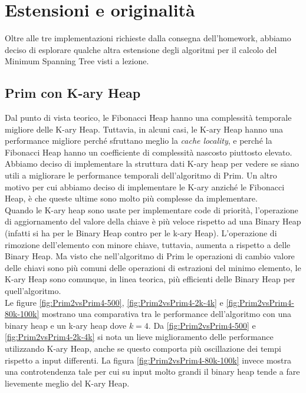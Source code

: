 \section{Estensioni e originalità}
\label{cap:extensions-and-originalities}

Oltre alle tre implementazioni richieste dalla consegna dell'homework, abbiamo deciso di esplorare qualche altra estensione degli algoritmi per il calcolo del Minimum Spanning Tree visti a lezione.

\subsection{Prim con K-ary Heap}

Dal punto di vista teorico, le Fibonacci Heap hanno una complessità temporale migliore delle K-ary Heap.
Tuttavia, in alcuni casi, le K-ary Heap hanno una performance migliore perché sfruttano meglio la \textit{cache locality}, e perché la Fibonacci Heap hanno un coefficiente di complessità nascosto piuttosto elevato. Abbiamo deciso di implementare la struttura dati K-ary heap per vedere se siano utili a migliorare le performance temporali dell'algoritmo di Prim.
Un altro motivo per cui abbiamo deciso di implementare le K-ary anziché le Fibonacci Heap, è che queste ultime sono molto più complesse da implementare. \\

\noindent Quando le K-ary heap sono usate per implementare code di priorità, l'operazione di aggiornamento del valore della chiave è più veloce rispetto ad una Binary Heap (infatti si ha \complexityLogN{} per le Binary Heap contro \complexityLogkN{} per le k-ary Heap).
L'operazione di rimozione dell'elemento con minore chiave, tuttavia, aumenta a \complexityKLogkN{} rispetto a \complexityLogN{} delle Binary Heap. Ma visto che nell'algoritmo di Prim le operazioni di cambio valore delle chiavi sono più comuni delle operazioni di estrazioni del minimo elemento, le K-ary Heap sono comunque, in linea teorica, più efficienti delle Binary Heap per quell'algoritmo. \\

\noindent Le figure \ref{fig:Prim2vsPrim4-500}, \ref{fig:Prim2vsPrim4-2k-4k} e \ref{fig:Prim2vsPrim4-80k-100k} mostrano una comparativa tra le performance
dell'algoritmo con una binary heap e un k-ary heap dove $k = 4$.
Da \ref{fig:Prim2vsPrim4-500} e \ref{fig:Prim2vsPrim4-2k-4k} si nota
un lieve miglioramento delle performance utilizzando K-ary Heap,
anche se questo comporta più oscillazione dei tempi rispetto a input
differenti. La figura \ref{fig:Prim2vsPrim4-80k-100k} invece mostra
una controtendenza tale per cui su input molto grandi il binary heap
tende a fare lievemente meglio del K-ary Heap.

